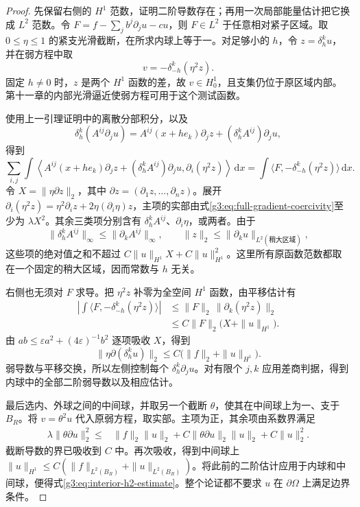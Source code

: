 \begin{proof}
	先保留右侧的 \(H^1\) 范数，证明二阶导数存在；再用一次局部能量估计把它换成 \(L^2\) 范数。令
	\(F=f-\sum_jb^j\partial_ju-cu\)，则 \(F\in L^2\) 于任意相对紧子区域。取 \(0\le\eta\le1\) 的紧支光滑截断，在所求内球上等于一。对足够小的 \(h\)，令 \(z=\delta_h^ku\)，并在弱方程中取
	\[
		v=-\delta_{-h}^k(\eta^2z).
	\]
	固定 \(h\ne0\) 时，\(z\) 是两个 \(H^1\) 函数的差，故 \(v\in H^1_0\)，且支集仍位于原区域内部。第十一章的内部光滑逼近使弱方程可用于这个测试函数。

	使用上一引理证明中的离散分部积分，以及
	\[
		\delta_h^k(A^{ij}\partial_ju)
		=A^{ij}(x+he_k)\partial_jz+(\delta_h^kA^{ij})\partial_ju,
	\]
	得到
	\[
		\sum_{i,j}\int\left\langle
		A^{ij}(x+he_k)\partial_jz+(\delta_h^kA^{ij})\partial_ju,
		\partial_i(\eta^2z)\right\rangle\,\mathrm dx
		=\int\langle F,-\delta_{-h}^k(\eta^2z)\rangle\,\mathrm dx.
	\]
	令 \(X=\|\eta\partial z\|_2\)，其中 \(\partial z=(\partial_1z,\ldots,\partial_nz)\)。展开 \(\partial_i(\eta^2z)=\eta^2\partial_iz+2\eta(\partial_i\eta)z\)，主项的实部由式\eqref{g3:eq:full-gradient-coercivity}至少为 \(\lambda X^2\)。其余三类项分别含有 \(\delta_h^kA^{ij}\)、\(\partial_i\eta\)，或两者。由于
	\[
		\|\delta_h^kA^{ij}\|_\infty\le\|\partial_kA^{ij}\|_\infty,
		\qquad \|z\|_2\le\|\partial_ku\|_{L^2(\text{稍大区域})},
	\]
	这些项的绝对值之和不超过
	\(C\|u\|_{H^1}X+C\|u\|_{H^1}^2\)。这里所有原函数范数都取在一个固定的稍大区域，因而常数与 \(h\) 无关。

	右侧也无须对 \(F\) 求导。把 \(\eta^2z\) 补零为全空间 \(H^1\) 函数，由平移估计有
	\[
	\begin{aligned}
		\left|\int\langle F,-\delta_{-h}^k(\eta^2z)\rangle\right|
		&\le\|F\|_2\,\|\partial_k(\eta^2z)\|_2\\
		&\le C\|F\|_2\bigl(X+\|u\|_{H^1}\bigr).
	\end{aligned}
	\]
	由 \(ab\le\varepsilon a^2+(4\varepsilon)^{-1}b^2\) 逐项吸收 \(X\)，得到
	\[
		\|\eta\partial(\delta_h^ku)\|_2
		\le C\bigl(\|f\|_2+\|u\|_{H^1}\bigr).
	\]
	弱导数与平移交换，所以左侧控制每个 \(\delta_h^k\partial_ju\)。对有限个 \(j,k\) 应用差商判据，得到内球中的全部二阶弱导数以及相应估计。

	最后选内、外球之间的中间球，并取另一个截断 \(\theta\)，使其在中间球上为一、支于 \(B_R\)。将 \(v=\theta^2u\) 代入原弱方程，取实部。主项为正，其余项由系数界满足
	\[
	\begin{aligned}
		\lambda\|\theta\partial u\|_2^2
		\le{}&\|f\|_2\|u\|_2
		+C\|\theta\partial u\|_2\|u\|_2
		+C\|u\|_2^2.
	\end{aligned}
	\]
	截断导数的界已吸收到 \(C\) 中。再次吸收，得到中间球上
	\(\|u\|_{H^1}\le C(\|f\|_{L^2(B_R)}+\|u\|_{L^2(B_R)})\)。将此前的二阶估计应用于内球和中间球，便得式\eqref{g3:eq:interior-h2-estimate}。整个论证都不要求 \(u\) 在 \(\partial\Omega\) 上满足边界条件。
\end{proof}

